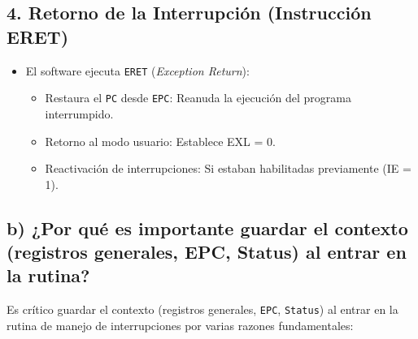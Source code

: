 \documentclass{article}
\begin{document}
\subsection*{4. Retorno de la Interrupción (Instrucción ERET)}
\begin{itemize}
    \item El software ejecuta \texttt{ERET} (\textit{Exception Return}):
    \begin{itemize}
        \item Restaura el \texttt{PC} desde \texttt{EPC}: Reanuda la ejecución del programa interrumpido.
        \item Retorno al modo usuario: Establece EXL = 0.
        \item Reactivación de interrupciones: Si estaban habilitadas previamente (IE = 1).
    \end{itemize}
\end{itemize}

\subsection*{b) ¿Por qué es importante guardar el contexto (registros generales, EPC, Status) al entrar en la rutina?}
Es crítico guardar el contexto (registros generales, \texttt{EPC}, \texttt{Status}) al entrar en la rutina de manejo de interrupciones por varias razones fundamentales:
\end{document}
